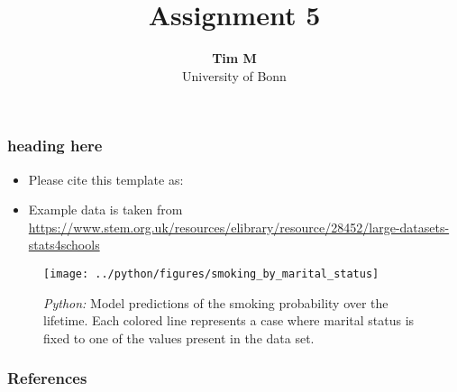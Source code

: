 \documentclass[11pt, aspectratio=169]{beamer}
\begin{document}
\title{Assignment 5}

\author[Tim M]
{
{\bf Tim M}\\
{\small University of Bonn}\\[1ex]
}


\begin{frame}
    \titlepage
    \note{~}
\end{frame}


\begin{frame}[t]
    \frametitle{heading here}
    \begin{itemize}
        \item<+-> Please cite this template as: \citet{GaudeckerEconProjectTemplates}
        \item<+-> Example data is taken from \url{https://www.stem.org.uk/resources/elibrary/resource/28452/large-datasets-stats4schools}
    \end{itemize}
    \note{~}
\end{frame}



\begin{frame}[t]
    \begin{figure}[H]

        \centering
        \texttt{[image: ../python/figures/smoking\_by\_marital\_status]}

        \caption{\emph{Python:} Model predictions of the smoking probability over the
            lifetime. Each colored line represents a case where marital status is fixed to
            one of the values present in the data set.}
        \label{fig:python-predictions}

    \end{figure}
\end{frame}






 {
    \begin{frame}
        \frametitle{}
    \end{frame}

}

\begin{frame}[allowframebreaks]
    \frametitle{References}
    \renewcommand{\bibfont}{\normalfont\footnotesize}
    \printbibliography
\end{frame}
\end{document}
